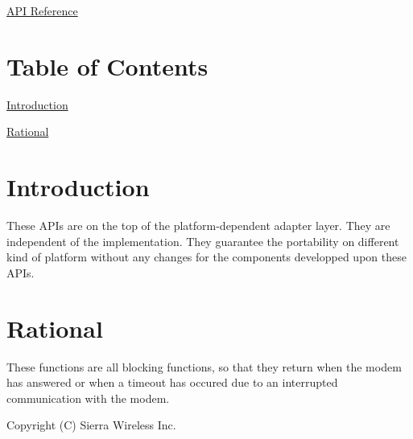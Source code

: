 \hyperlink{pa__mdc_8h}{A\+PI Reference}



\hypertarget{c_pa_mdc_pa_mdc_toc}{}\section{Table of Contents}\label{c_pa_mdc_pa_mdc_toc}

\begin{DoxyItemize}
\item \hyperlink{c_pa_mdc_pa_mdc_intro}{Introduction}
\item \hyperlink{c_pa_mdc_pa_mdc_rational}{Rational}
\end{DoxyItemize}\hypertarget{c_pa_mdc_pa_mdc_intro}{}\section{Introduction}\label{c_pa_mdc_pa_mdc_intro}
These A\+P\+Is are on the top of the platform-\/dependent adapter layer. They are independent of the implementation. They guarantee the portability on different kind of platform without any changes for the components developped upon these A\+P\+Is.\hypertarget{c_pa_mdc_pa_mdc_rational}{}\section{Rational}\label{c_pa_mdc_pa_mdc_rational}
These functions are all blocking functions, so that they return when the modem has answered or when a timeout has occured due to an interrupted communication with the modem.





Copyright (C) Sierra Wireless Inc. 
